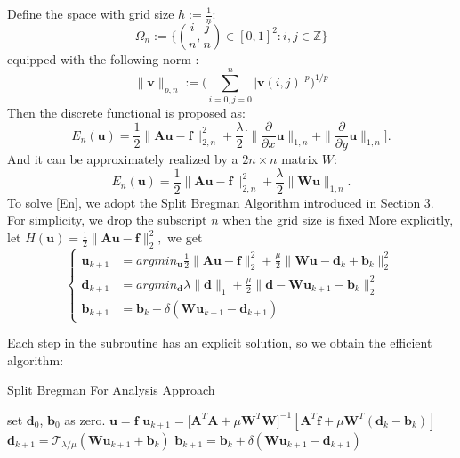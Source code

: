 \documentclass{article}
\begin{document}
Define the space with grid size $h:=\frac 1n$:
\begin{equation}
\Omega_n := \{(\frac in,\frac jn)\in [0,1]^2:i,j\in \mathbb Z\}
\end{equation}
equipped with the following norm :
\begin{equation}
\|\bm{v}\|_{p,n} := \big(\sum_{i=0,j=0}^{n}|\bm{v}(i,j)|^p\big)^{1/p}
\end{equation}
Then the discrete functional is proposed as:
\begin{equation}
E_n(\bm{u}) = \frac 12\|\bm{A}\bm{u}-\bm{f}\|_{2,n}^2 + \frac{\lambda}{2}\big[\|\frac{\partial}{\partial x}\bm{u}\|_{1,n} + \|\frac{\partial}{\partial y}\bm{u}\|_{1,n} \big].
\end{equation}
And it can be approximately realized by a $2n \times n$ matrix $W$:
\begin{equation}
\label{En}
E_n(\bm{u}) = \frac 12\|\bm{A}\bm{u}-\bm{f}\|_{2,n}^2 + \frac{\lambda}{2}\|\bm{W}\bm{u}\|_{1,n} .
\end{equation}
To solve \eqref{En}, we adopt the Split Bregman Algorithm introduced in Section 3. For simplicity, we drop the subscript $n$ when the grid size is fixed More explicitly, let $H(\bm{u}) = \frac 12\|\bm{A}\bm{u}-\bm{f}\|_2^2,$ we get
$$
\left\{\begin{array}{rl}
\bm{u}_{k+1} &= argmin_{\bm{u}} \frac 12\|\bm{A}\bm{u}-\bm{f}\|_2^2 +\frac{\mu}{2} \|\bm{W}\bm{u} - \bm{d}_{k} + \bm{b}_{k}\|_2^2 \\ 
\bm{d}_{k+1} &=argmin_{\bm{d}}\lambda \|\bm{d}\|_1 + \frac{\mu}{2} \|\bm{d} - \bm{W}\bm{u}_{k+1} - \bm{b}_{k}\|_2^2 \\
\bm{b}_{k+1} &= \bm{b}_{k} + \delta (\bm{W}\bm{u}_{k+1} - \bm{d}_{k+1})
\end{array}
\right.
$$

Each step in the subroutine has an explicit solution, so we obtain the efficient algorithm:
\begin{algorithm}
\caption{Split Bregman For Analysis Approach}
\begin{algorithmic}[1]
\STATE set $\bm{d}_0$, $\bm{b}_0$ as zero.
\STATE $\bm{u} = \bm{f}$ 
\REPEAT
\STATE $\bm{u}_{k+1} = \big[\bm{A}^T\bm{A} + \mu \bm{W}^T\bm{W} \big]^{-1}[\bm{A}^T\bm{f} + \mu \bm{W}^T(\bm{d}_{k} - \bm{b}_{k})]$
\STATE $\bm{d}_{k+1} = \mathcal{T}_{\lambda/\mu}(\bm{W}\bm{u}_{k+1} + \bm{b}_{k})$
\STATE $\bm{b}_{k+1} = \bm{b}_{k} + \delta(\bm{W}\bm{u}_{k+1} - \bm{d}_{k+1})$
\end{algorithmic}
\end{algorithm}
\end{document}
